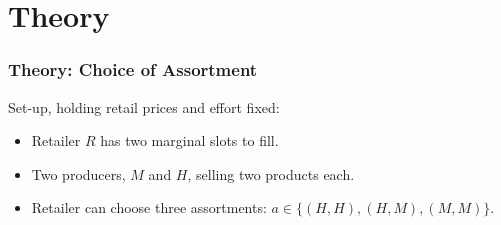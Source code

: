 \documentclass[aspectratio=169]{beamer}
\begin{document}
\section{Theory}

\begin{frame}[label=intuition]
\frametitle{Theory: Choice of Assortment}
Set-up, holding retail prices and effort fixed:
\begin{itemize}
\item Retailer $R$ has two marginal slots to fill.
\item Two producers, $M$ and $H$, selling two products each.
\item Retailer can choose three assortments: $a \in \{ (H,H), (H,M), (M,M)\}$.
\end{itemize}
\end{frame}
\end{document}

